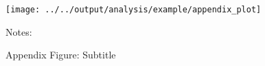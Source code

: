\clearpage

\begin{figure}[H]
{\small{}\caption*{Appendix Figure: Subtitle}}\label{fig:variants}

\medskip{}

\begin{centering}
\texttt{[image: ../../output/analysis/example/appendix\_plot]}
\par\end{centering}
\begin{centering}
\smallskip{}
\par\end{centering}
{\small{}Notes: }{\small \par}
\end{figure}

\newpage{}
